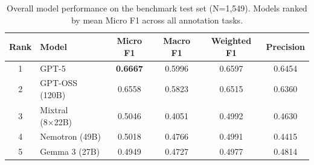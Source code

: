 \begin{table}[h!]
\centering
\caption{Overall model performance on the benchmark test set (N=1,549). Models ranked by mean Micro F1 across all annotation tasks.}
\label{tab:main_results}
\begin{tabular}{clcccc}
\toprule
\textbf{Rank} & \textbf{Model} & \textbf{Micro F1} & \textbf{Macro F1} & \textbf{Weighted F1} & \textbf{Precision} \\
\midrule
1 & GPT-5 & \textbf{0.6667} & 0.5996 & 0.6597 & 0.6454 \\
2 & GPT-OSS (120B) & 0.6558 & 0.5823 & 0.6515 & 0.6360 \\
3 & Mixtral (8×22B) & 0.5046 & 0.4051 & 0.4992 & 0.4630 \\
4 & Nemotron (49B) & 0.5018 & 0.4766 & 0.4991 & 0.4415 \\
5 & Gemma 3 (27B) & 0.4949 & 0.4727 & 0.4977 & 0.4814 \\
\bottomrule
\end{tabular}
\end{table}